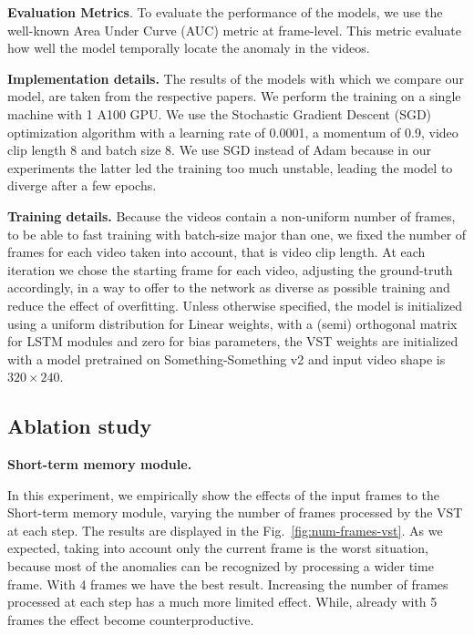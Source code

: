 \noindent\textbf{Evaluation Metrics}.
To evaluate the performance of the models, we use the well-known Area Under Curve (AUC) metric at frame-level.
This metric evaluate how well the model temporally locate the anomaly in the videos. 

\noindent\textbf{Implementation details.}
The results of the models with which we compare our model, are taken from the respective papers.
We perform the training on a single machine with 1 A100 GPU.
We use the Stochastic Gradient Descent (SGD) optimization algorithm with a learning rate of 0.0001, a momentum of 0.9, video clip length 8 and batch size 8.
We use SGD instead of Adam because in our experiments the latter led the training too much unstable, leading the model to diverge after a few epochs.

\noindent\textbf{Training details.}
Because the videos contain a non-uniform number of frames, to be able to fast training with batch-size major than one, we fixed the number of frames for each video taken into account, that is video clip length.
At each iteration we chose the starting frame for each video, adjusting the ground-truth accordingly, in a way to offer to the network as diverse as possible training and reduce the effect of overfitting.
Unless otherwise specified, the model is initialized using a uniform distribution for Linear weights, with a (semi) orthogonal matrix for LSTM modules and zero for bias parameters, the VST weights are initialized with a model pretrained on Something-Something v2 and input video shape is $320 \times 240$.

\subsection{Ablation study}


\noindent\textbf{Short-term memory module.}

In this experiment, we empirically show the effects of the input frames to the Short-term memory module, varying the number of frames processed by the VST at each step.
The results are displayed in the Fig.~\ref{fig:num-frames-vst}.
As we expected, taking into account only the current frame is the worst situation, because most of the anomalies can be recognized by processing a wider time frame.
With 4 frames we have the best result.
Increasing the number of frames processed at each step has a much more limited effect.
While, already with 5 frames the effect become counterproductive.

